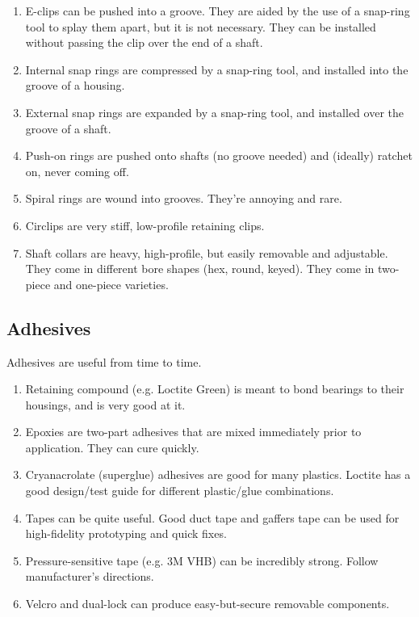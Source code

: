 \documentclass[10pt,letterpaper]{book}
\begin{document}
	
	\begin{enumerate}[label=\alph*]
		\item E-clips can be pushed into a groove. They are aided by the use of a snap-ring tool to splay them apart, but it is not necessary. They can be installed without passing the clip over the end of a shaft.
		\item Internal snap rings are compressed by a snap-ring tool, and installed into the groove of a housing.
		\item External snap rings are expanded by a snap-ring tool, and installed over the groove of a shaft.
		\item Push-on rings are pushed onto shafts (no groove needed) and (ideally) ratchet on, never coming off.
		\item Spiral rings are wound into grooves. They're annoying and rare.
		\item Circlips are very stiff, low-profile retaining clips.
		\item Shaft collars are heavy, high-profile, but easily removable and adjustable. They come in different bore shapes (hex, round, keyed). They come in two-piece and one-piece varieties.
	\end{enumerate}
	
	\subsection{Adhesives}
	
	Adhesives are useful from time to time.
	
	\begin{enumerate}[label=\alph*]
		\item Retaining compound (e.g. Loctite Green) is meant to bond bearings to their housings, and is very good at it.
		\item Epoxies are two-part adhesives that are mixed immediately prior to application. They can cure quickly.
		\item Cryanacrolate (superglue) adhesives are good for many plastics. Loctite has a good design/test guide for different plastic/glue combinations.
		\item Tapes can be quite useful. Good duct tape and gaffers tape can be used for high-fidelity prototyping and quick fixes.
		\item Pressure-sensitive tape (e.g. 3M VHB) can be incredibly strong. Follow manufacturer's directions.
		\item Velcro and dual-lock can produce easy-but-secure removable components.
	\end{enumerate}
\end{document}
